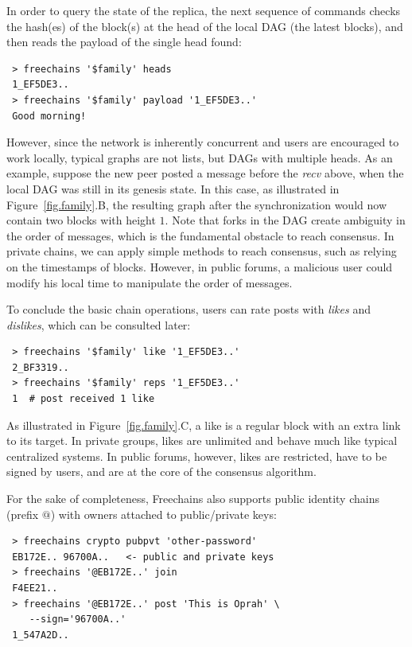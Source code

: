 \documentclass[10pt,journal,compsoc]{IEEEtran}
\newcommand{\FC}       {Freechains\xspace}
\begin{document}
In order to query the state of the replica, the next sequence of commands
checks the hash(es) of the block(s) at the head of the local DAG (the latest
blocks), and then reads the payload of the single head found:

{\footnotesize
\begin{verbatim}
 > freechains '$family' heads
 1_EF5DE3..
 > freechains '$family' payload '1_EF5DE3..'
 Good morning!
\end{verbatim}
}

However, since the network is inherently concurrent and users are encouraged to
work locally, typical graphs are not lists, but DAGs with multiple heads.
As an example, suppose the new peer posted a message before the \emph{recv}
above, when the local DAG was still in its genesis state.
In this case, as illustrated in Figure~\ref{fig.family}.B, the resulting graph
after the synchronization would now contain two blocks with height $1$.
%
Note that forks in the DAG create ambiguity in the order of messages, which is
the fundamental obstacle to reach consensus.
In private chains, we can apply simple methods to reach consensus, such as
relying on the timestamps of blocks.
However, in public forums, a malicious user could modify his local time to
manipulate the order of messages.

To conclude the basic chain operations, users can rate posts with \emph{likes}
and \emph{dislikes}, which can be consulted later:

{\footnotesize
\begin{verbatim}
 > freechains '$family' like '1_EF5DE3..'
 2_BF3319..
 > freechains '$family' reps '1_EF5DE3..'
 1  # post received 1 like
\end{verbatim}
}

As illustrated in Figure~\ref{fig.family}.C, a like is a regular block with an
extra link to its target.
In private groups, likes are unlimited and behave much like typical centralized
systems.
In public forums, however, likes are restricted, have to be signed by users,
and are at the core of the consensus algorithm.

For the sake of completeness, \FC also supports public identity chains (prefix
$@$) with owners attached to public/private keys:

{\footnotesize
\begin{verbatim}
 > freechains crypto pubpvt 'other-password'
 EB172E.. 96700A..   <- public and private keys
 > freechains '@EB172E..' join
 F4EE21..
 > freechains '@EB172E..' post 'This is Oprah' \
    --sign='96700A..'
 1_547A2D..
\end{verbatim}
}
\end{document}
